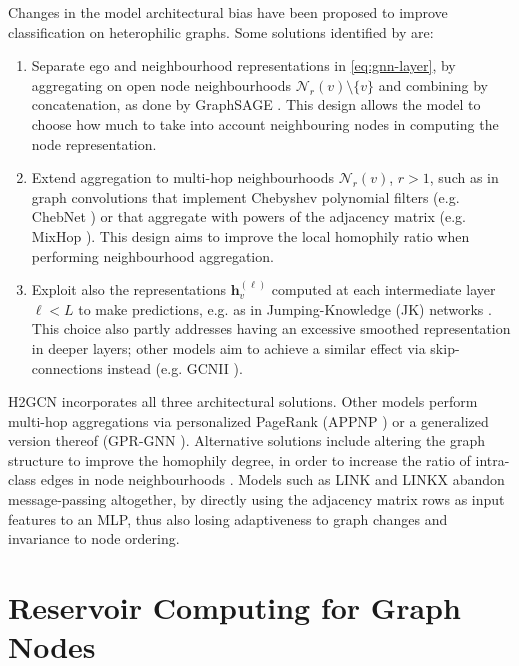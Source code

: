 \documentclass[final,5p,times,twocolumn]{elsarticle}
\begin{document}
Changes in the model architectural bias have been proposed to improve classification on heterophilic graphs.
Some solutions identified by \cite{Zhu2020} are:
\begin{enumerate}
	\item Separate ego and neighbourhood representations in \eqref{eq:gnn-layer}, by aggregating on open node neighbourhoods $\mathcal{N}_r(v) \setminus \{v\}$ and combining by concatenation, as done by GraphSAGE \cite{Hamilton2017}.
	This design allows the model to choose how much to take into account neighbouring nodes in computing the node representation.
	\item Extend aggregation to multi-hop neighbourhoods $\mathcal{N}_r(v)$, $r > 1$, such as in graph convolutions that implement Chebyshev polynomial filters (e.g. ChebNet \cite{Defferrard2016}) or that aggregate with powers of the adjacency matrix (e.g. MixHop \cite{AbuElHaija2019}).
	This design aims to improve the local homophily ratio when performing neighbourhood aggregation.
	\item Exploit also the representations $\mathbf{h}_v^{(\ell)}$ computed at each intermediate layer $\ell < L$ to make predictions, e.g. as in Jumping-Knowledge (JK) networks \cite{Xu2018}.
	This choice also partly addresses having an excessive smoothed representation in deeper layers; other models aim to achieve a similar effect via skip-connections instead (e.g. GCNII \cite{ChenMing2020}).
\end{enumerate}
H2GCN \cite{Zhu2020} incorporates all three architectural solutions.
Other models perform multi-hop aggregations via personalized PageRank (APPNP \cite{Klicpera2019}) or a generalized version thereof (GPR-GNN \cite{Chien2021}).
Alternative solutions include altering the graph structure to improve the homophily degree, in order to increase the ratio of intra-class edges in node neighbourhoods \cite{Gasteiger2019}.
Models such as LINK \cite{Zheleva2009} and LINKX \cite{Lim2021} abandon message-passing altogether, by directly using the adjacency matrix rows as input features to an MLP, thus also losing adaptiveness to graph changes and invariance to node ordering.

\section{Reservoir Computing for Graph Nodes}
\label{sec:gesn}
\end{document}

